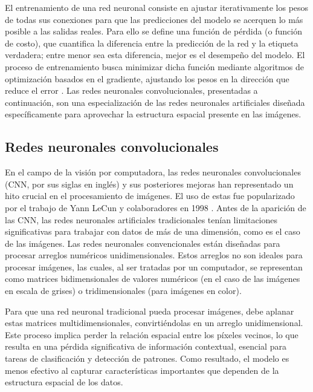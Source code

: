 El entrenamiento de una red neuronal consiste en ajustar iterativamente los pesos de
todas sus conexiones para que las predicciones del modelo se acerquen lo más posible a
las salidas reales. Para ello se define una función de pérdida (o función de costo), que
cuantifica la diferencia entre la predicción de la red y la etiqueta verdadera; entre
menor sea esta diferencia, mejor es el desempeño del modelo. El proceso de entrenamiento
busca minimizar dicha función mediante algoritmos de optimización basados en el
gradiente, ajustando los pesos en la dirección que reduce el error
. Las redes neuronales convolucionales, presentadas a
continuación, son una especialización de las redes neuronales artificiales diseñada
específicamente para aprovechar la estructura espacial presente en las imágenes.

\subsection{Redes neuronales convolucionales}

En el campo de la visión por computadora, las redes neuronales convolucionales (CNN, por
sus siglas en inglés) y sus posteriores mejoras han representado un hito crucial en el
procesamiento de imágenes. El uso de estas fue popularizado por el trabajo de Yann LeCun
y colaboradores en 1998 . Antes de la aparición de las CNN,
las redes neuronales artificiales tradicionales tenían limitaciones significativas para
trabajar con datos de más de una dimensión, como es el caso de las imágenes. Las redes
neuronales convencionales están diseñadas para procesar arreglos numéricos
unidimensionales. Estos arreglos no son ideales para procesar imágenes, las cuales, al
ser tratadas por un computador, se representan como matrices bidimensionales de valores
numéricos (en el caso de las imágenes en escala de grises) o tridimensionales (para
imágenes en color).

Para que una red neuronal tradicional pueda procesar imágenes, debe aplanar estas
matrices multidimensionales, convirtiéndolas en un arreglo unidimensional. Este proceso
implica perder la relación espacial entre los píxeles vecinos, lo que resulta en una
pérdida significativa de información contextual, esencial para tareas de clasificación y
detección de patrones. Como resultado, el modelo es menos efectivo al capturar
características importantes que dependen de la estructura espacial de los datos.

